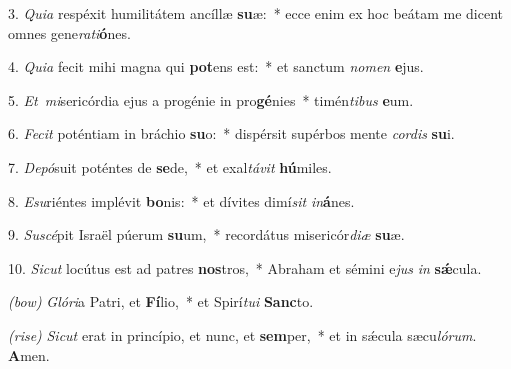 3. \textit{Quia} respéxit humilitátem ancíllæ \textbf{su}æ:~*
	ecce enim ex hoc beátam me dicent omnes gene\textit{ra}\textit{ti}\textbf{ó}nes.

4. \textit{Quia} fecit mihi magna qui \textbf{pot}ens est:~* 
	et sanctum \textit{no}\textit{men} \textbf{e}jus.

5. \textit{Et\ mi}sericórdia ejus a progénie in pro\textbf{gé}nies~*
	timén\textit{ti}\textit{bus} \textbf{e}um.

6. \textit{Fecit} poténtiam in bráchio \textbf{su}o:~*
	dispérsit supérbos mente \textit{cor}\textit{dis} \textbf{su}i.

7. \textit{Depó}suit poténtes de \textbf{se}de,~*
	et exal\textit{tá}\textit{vit} \textbf{hú}miles.

8. \textit{Esu}riéntes implévit \textbf{bo}nis:~*
	et dívites dimí\textit{sit} \textit{in}\textbf{á}nes.

9. \textit{Suscé}pit Israël púerum \textbf{su}um,~*
	recordátus misericór\textit{di}\textit{æ} \textbf{su}æ.

10. \textit{Sicut} locútus est ad patres \textbf{nos}tros,~*
	Abraham et sémini e\textit{jus} \textit{in} \textbf{s\'{\ae}}cula.

{\color{red}\textit{(bow)}} \textit{Glóri}a Patri, et \textbf{Fí}lio,~* 
	et Spirí\textit{tu}\textit{i} \textbf{Sanc}to.

{\color{red}\textit{(rise)}} \textit{Sicut} erat in princípio, et nunc, et \textbf{sem}per,~*
	et in s\'{\ae}cula sæcu\textit{ló}\textit{rum}. \textbf{A}men.